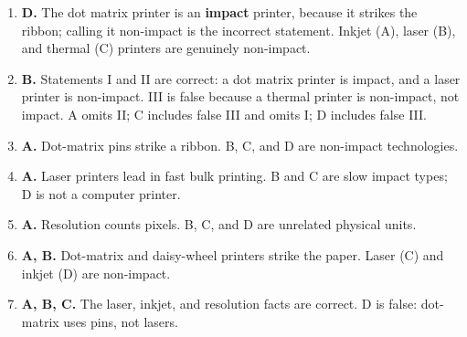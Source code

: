 \documentclass[11pt]{article}
\begin{document}
\begin{enumerate}[label=\textbf{Q\arabic*.}, leftmargin=*]
  in nits (cd/m$^2$). Hertz (A) measures refresh rate; milliseconds (C)
  measure response time; DPI (D) measures sharpness.
\item \textbf{D.} The dot matrix printer is an \textbf{impact} printer,
  because it strikes the ribbon; calling it non-impact is the incorrect
  statement. Inkjet (A), laser (B), and thermal (C) printers are genuinely
  non-impact.
\item \textbf{B.} Statements I and II are correct: a dot matrix printer is
  impact, and a laser printer is non-impact. III is false because a thermal
  printer is non-impact, not impact. A omits II; C includes false III and
  omits I; D includes false III.

\item \textbf{A.} Dot-matrix pins strike a ribbon. B, C, and D are non-impact technologies.
\item \textbf{A.} Laser printers lead in fast bulk printing. B and C are slow impact types; D is not a computer printer.
\item \textbf{A.} Resolution counts pixels. B, C, and D are unrelated physical units.
\item \textbf{A, B.} Dot-matrix and daisy-wheel printers strike the paper. Laser (C) and inkjet (D) are non-impact.
\item \textbf{A, B, C.} The laser, inkjet, and resolution facts are correct. D is false: dot-matrix uses pins, not lasers.
\end{enumerate}
\def\JKSSBLessonID{15}\def\JKSSBAnswers{1}
\end{document}
